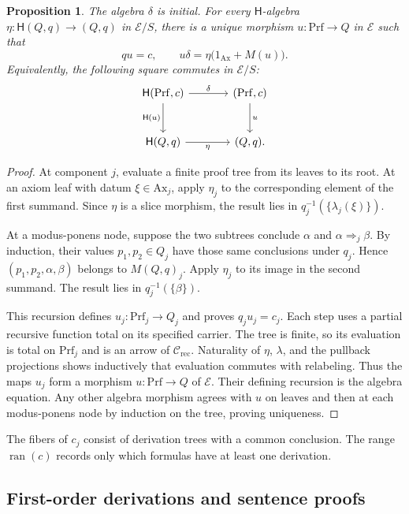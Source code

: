 \documentclass[11pt]{article}
\newtheorem{proposition}[theorem]{Proposition}
\newcommand{\ran}{\operatorname{ran}}
\begin{document}
\begin{proposition}\label{prop:fork-proof-initial}
The algebra $\delta$ is initial. For every
$\mathsf H$-algebra
$\eta:\mathsf H(Q,q)\to(Q,q)$ in $\mathcal E/S$, there is a unique
morphism $u:\mathrm{Prf}\to Q$ in $\mathcal E$ such that
\[
 qu=c,\qquad
 u\delta=\eta\bigl(1_{\mathrm{Ax}}+M(u)\bigr).
\]
Equivalently, the following square commutes in $\mathcal E/S$:
\[
\begin{tikzcd}[column sep=large,row sep=large]
 \mathsf H(\mathrm{Prf},c) \arrow[r,"\delta"]
       \arrow[d,"\mathsf H(u)"'] &
 (\mathrm{Prf},c) \arrow[d,"u"] \\
 \mathsf H(Q,q) \arrow[r,"\eta"'] & (Q,q).
\end{tikzcd}
\]
\end{proposition}
\begin{proof}
At component $j$, evaluate a finite proof tree from its leaves to
its root. At an axiom leaf with datum $\xi\in\mathrm{Ax}_j$, apply
$\eta_j$ to the corresponding element of the first summand.
Since $\eta$ is a slice morphism, the result lies in
$q_j^{-1}(\{\lambda_j(\xi)\})$.

At a modus-ponens node, suppose the two subtrees conclude
$\alpha$ and $\alpha\Rightarrow_j\beta$.
By induction, their values $p_1,p_2\in Q_j$ have those same
conclusions under $q_j$. Hence
$(p_1,p_2,\alpha,\beta)$ belongs to $M(Q,q)_j$.
Apply $\eta_j$ to its image in the second summand. The result
lies in $q_j^{-1}(\{\beta\})$.

This recursion defines $u_j:\mathrm{Prf}_j\to Q_j$ and proves
$q_ju_j=c_j$. Each step uses a partial recursive function total
on its specified carrier. The tree is finite, so its evaluation
is total on $\mathrm{Prf}_j$ and is an arrow of
$\mathcal C_{\mathrm{rec}}$.
Naturality of $\eta$, $\lambda$, and the pullback projections
shows inductively that evaluation commutes with relabeling.
Thus the maps $u_j$ form a morphism $u:\mathrm{Prf}\to Q$ of
$\mathcal E$. Their defining recursion is the algebra equation.
Any other algebra morphism agrees with $u$ on leaves and then
at each modus-ponens node by induction on the tree, proving uniqueness.
\end{proof}

The fibers of $c_j$ consist of derivation trees with a common
conclusion. The range $\ran(c)$ records only which formulas
have at least one derivation.


\subsection{First-order derivations and sentence proofs}
\label{app:first-order-proofs}
\end{document}
